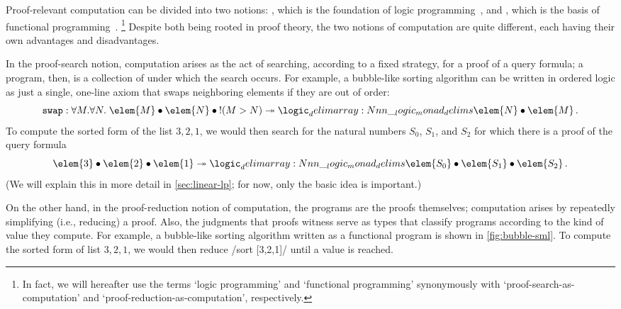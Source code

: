 Proof-relevant computation can be divided into two notions: , which is the foundation of logic programming~\autocite{Miller+:PAL91,Andreoli:JLC92}, and , which is the basis of functional programming~\autocite{Howard:Curry80,Martin-Lof:LMPS80}.%
\footnote{In fact, we will hereafter use the terms `logic programming' and `functional programming' synonymously with `proof-search-as-computation' and `proof-reduction-as-computation', respectively.}
Despite both being rooted in proof theory, the two notions of computation are quite different, each having their own advantages and disadvantages.

In the proof-search notion, computation arises as the act of searching, according to a fixed strategy, for a proof of a query formula; a program, then, is a collection of  under which the search occurs.
For example, a bubble-like sorting algorithm can be written in ordered logic as just a single, one-line axiom that swaps neighboring elements if they are out of order:
%
\begin{equation*}
  \rulename{swap} : \forall M.\forall N.\; \elem{M} \fuse \elem{N} \fuse \bang (M > N) \rimp \monad{\elem{N} \fuse \elem{M}} \,.
\end{equation*}
To compute the sorted form of the list $3,2,1$, we would then search for the natural numbers $S_0$, $S_1$, and $S_2$ for which there is a proof of the query formula
\begin{equation*}
  \elem{3} \fuse \elem{2} \fuse \elem{1} \rimp \monad{\elem{S_0} \fuse \elem{S_1} \fuse \elem{S_2}} \,.
\end{equation*}
(We will explain this in more detail in \cref{sec:linear-lp}; for now, only the basic idea is important.)

On the other hand, in the proof-reduction notion of computation, the programs are the proofs themselves; computation arises
by repeatedly simplifying (i.e., reducing) a proof.
Also, the judgments that proofs witness serve as types that classify programs according to the kind of value they compute.
For example, a bubble-like sorting algorithm written as a functional program is shown in \cref{fig:bubble-sml}.
To compute the sorted form of list $3,2,1$, we would then reduce \sml/sort [3,2,1]/ until a value is reached.

